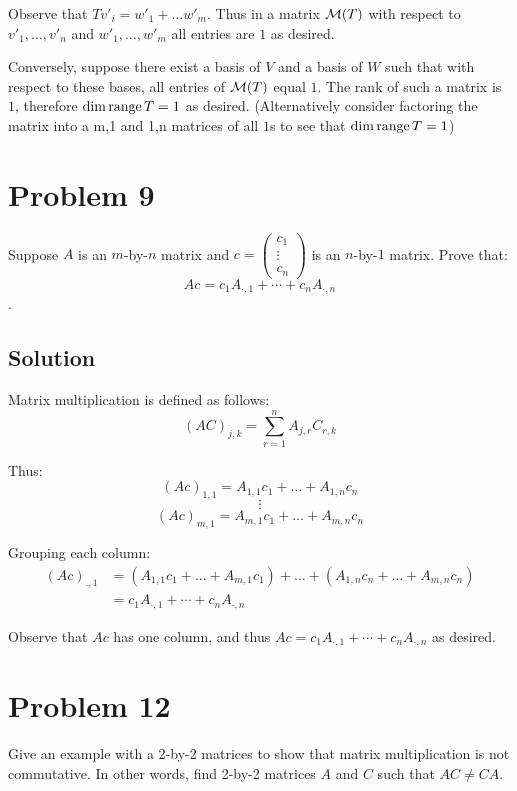 \documentclass{article}
\begin{document}
Observe that $Tv'_i=w'_1+\ldots w'_m$. Thus in a matrix $\M(T)$ with respect to $v'_1,\ldots,v'_n$ and $w'_1,\ldots,w'_m$ all entries are $1$ as desired.

\vs

Conversely, suppose there exist a basis of $V$ and a basis of $W$ such that with respect to these bases, all entries of $\M(T)$ equal $1$. The rank of such a matrix is $1$, therefore $\dim\text{range}\, T=1$ as desired. (Alternatively consider factoring the matrix into a m,1 and 1,n matrices of all $1$s to see that $\dim\text{range}\, T=1$)

\section*{Problem 9}
Suppose $A$ is an $m$-by-$n$ matrix and
$c = \begin{pmatrix}
c_1 \\
\vdots \\
c_n
\end{pmatrix}$ is an $n$-by-$1$ matrix. Prove that:
\[Ac = c_1 A_{\cdot,1} + \cdots + c_n A_{\cdot,n}\].

\subsection*{Solution}
Matrix multiplication is defined as follows:
\[(AC)_{j,k} = \sum_{r=1}^{n} A_{j,r} C_{r,k}\]

Thus:
\[(Ac)_{1,1}=A_{1,1}c_1+\ldots+A_{1,n}c_n\]
\[\vdots\]
\[(Ac)_{m,1}=A_{m,1}c_1+\ldots+A_{m,n}c_n\]

Grouping each column:
\begin{align*}
(Ac)_{.,1}&=(A_{1,1}c_1 + \ldots + A_{m,1}c_1)+\ldots+(A_{1,n}c_n + \ldots + A_{m,n}c_n)\\
&=c_1 A_{\cdot,1} + \cdots + c_n A_{\cdot,n}
\end{align*}

Observe that $Ac$ has one column, and thus $Ac = c_1 A_{\cdot,1} + \cdots + c_n A_{\cdot,n}$ as desired.

\section*{Problem 12}
Give an example with a 2-by-2 matrices to show that matrix multiplication is not commutative. In other words, find 2-by-2 matrices $A$ and $C$ such that $AC\neq CA$.
\end{document}
